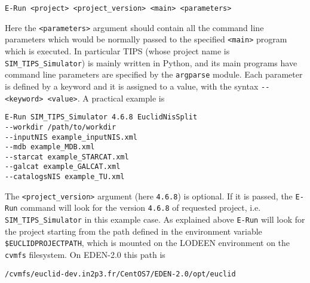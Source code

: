 \begin{center}
\verb+E-Run <project> <project_version> <main> <parameters>+
\end{center}

Here the \verb+<parameters>+ argument should contain all the command line parameters which would be normally passed to the specified \verb+<main>+ program which is executed. In particular TIPS (whose project name is \verb+SIM_TIPS_Simulator+) is mainly written in Python, and its main programs have command line parameters are specified by the \verb+argparse+ module. Each parameter is defined by a keyword and it is assigned to a value, with the syntax \verb+--<keyword> <value>+. A practical example is

\begin{verbatim}
E-Run SIM_TIPS_Simulator 4.6.8 EuclidNisSplit
--workdir /path/to/workdir 
--inputNIS example_inputNIS.xml 
--mdb example_MDB.xml 
--starcat example_STARCAT.xml
--galcat example_GALCAT.xml  
--catalogsNIS example_TU.xml
\end{verbatim}

The \verb+<project_version>+ argument (here \verb+4.6.8+) is optional. If it is passed, the \verb+E-Run+ command will look for the version \verb+4.6.8+ of requested project, i.e. \verb+SIM_TIPS_Simulator+ in this example case. As explained above \verb+E-Run+ will look for the project starting from the path defined in the environment variable \verb+$EUCLIDPROJECTPATH+, which is mounted on the LODEEN environment on the \verb+cvmfs+ filesystem. On EDEN-2.0 this path is

\begin{verbatim}
/cvmfs/euclid-dev.in2p3.fr/CentOS7/EDEN-2.0/opt/euclid
\end{verbatim}